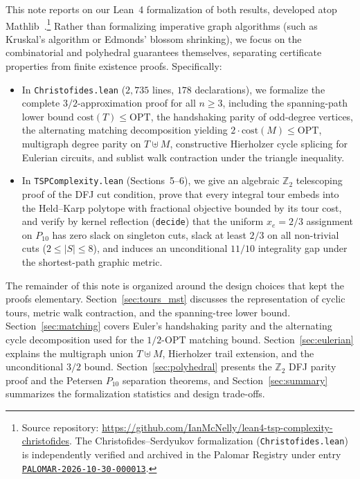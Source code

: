 This note reports on our Lean~4 formalization of both results, developed atop Mathlib~\cite{mathlib2020}.\footnote{Source repository: \url{https://github.com/IanMcNelly/lean4-tsp-complexity-christofides}. The Christofides--Serdyukov formalization (\texttt{Christofides.lean}) is independently verified and archived in the Palomar Registry under entry \href{https://palomar-registry.org/entry?id=PALOMAR-2026-10-30-000013&version=1}{\texttt{PALOMAR-2026-10-30-000013}}.} Rather than formalizing imperative graph algorithms (such as Kruskal's algorithm or Edmonds' blossom shrinking), we focus on the combinatorial and polyhedral guarantees themselves, separating certificate properties from finite existence proofs. Specifically:
\begin{itemize}
  \item In \texttt{Christofides.lean} ($2{,}735$ lines, $178$ declarations), we formalize the complete $3/2$-approximation proof for all $n \ge 3$, including the spanning-path lower bound $\mathrm{cost}(T) \le \mathrm{OPT}$, the handshaking parity of odd-degree vertices, the alternating matching decomposition yielding $2\cdot\mathrm{cost}(M) \le \mathrm{OPT}$, multigraph degree parity on $T \uplus M$, constructive Hierholzer cycle splicing for Eulerian circuits, and sublist walk contraction under the triangle inequality.
  \item In \texttt{TSPComplexity.lean} (Sections~5--6), we give an algebraic $\mathbb{Z}_2$ telescoping proof of the DFJ cut condition, prove that every integral tour embeds into the Held--Karp polytope with fractional objective bounded by its tour cost, and verify by kernel reflection (\texttt{decide}) that the uniform $x_e = 2/3$ assignment on $P_{10}$ has zero slack on singleton cuts, slack at least $2/3$ on all non-trivial cuts ($2 \le |S| \le 8$), and induces an unconditional $11/10$ integrality gap under the shortest-path graphic metric.
\end{itemize}

The remainder of this note is organized around the design choices that kept the proofs elementary. Section~\ref{sec:tours_mst} discusses the representation of cyclic tours, metric walk contraction, and the spanning-tree lower bound. Section~\ref{sec:matching} covers Euler's handshaking parity and the alternating cycle decomposition used for the $1/2\text{-}\mathrm{OPT}$ matching bound. Section~\ref{sec:eulerian} explains the multigraph union $T \uplus M$, Hierholzer trail extension, and the unconditional $3/2$ bound. Section~\ref{sec:polyhedral} presents the $\mathbb{Z}_2$ DFJ parity proof and the Petersen $P_{10}$ separation theorems, and Section~\ref{sec:summary} summarizes the formalization statistics and design trade-offs.

